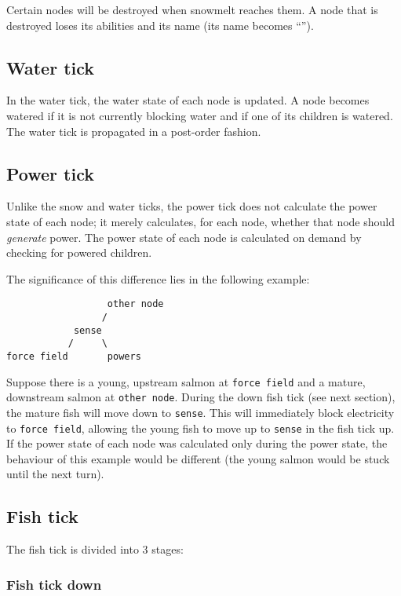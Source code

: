 \documentclass[10pt]{article}
\begin{document}
Certain nodes will be destroyed when snowmelt reaches them. A node that is destroyed loses its abilities and its name
(its name becomes ``'').

\subsection{Water tick}

In the water tick, the water state of each node is updated. A node becomes watered if it is not currently blocking water
and if one of its children is watered. The water tick is propagated in a post-order fashion.

\subsection{Power tick}

Unlike the snow and water ticks, the power tick does not calculate the power state of each node; it merely
calculates, for each node, whether that node should \emph{generate} power. The power state of each node is calculated on
demand by checking for powered children.

The significance of this difference lies in the following example:
\begin{verbatim}
                  other node
                 /
            sense
           /     \
force field       powers
\end{verbatim}
Suppose there is a young, upstream salmon at \texttt{force field} and a mature, downstream salmon at \texttt{other node}.
During the down fish tick (see next section), the mature fish will move down to \texttt{sense}. This will immediately
block electricity to \texttt{force field}, allowing the young fish to move up to \texttt{sense} in the fish tick up. If
the power
state of each node was calculated only during the power state, the behaviour of this example would be different (the
young salmon would be stuck until the next turn).

\subsection{Fish tick}

The fish tick is divided into 3 stages:

\subsubsection{Fish tick down}
\end{document}
